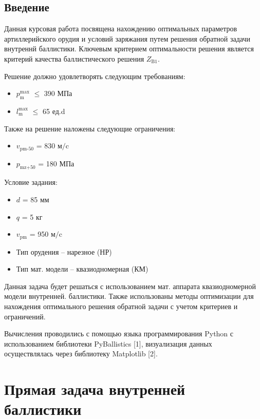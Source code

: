 \documentclass[14pt, a4paper]{extreport} %
\begin{document}


\newpage
\tableofcontents

\newpage
\section*{Введение}
Данная курсовая работа посвящена нахождению оптимальных параметров артиллерийского орудия и условий заряжания путем решения обратной задачи внутреннй баллистики.
Ключевым критерием оптимальности решения является критерий качества баллистического решения $Z_{\text{B1}}$. 

Решение должно удовлетворять следующим требованиям: 
\begin{itemize}
    \item  $p_{\text{m}}^{\text{max}}$ $\leq$ 390 МПа
    \item $l_{\text{m}}^{\text{max}}$ $\leq$ 65 ед.d
\end{itemize}

Также на решение наложены следующие ограничения: 
\begin{itemize}
    \item  $v_{\text{pm-50}}$ = 830 $\text{м/c}$
    \item $p_{\text{mz+50}}$ = 180 МПа
\end{itemize}

Условие задания: 
\begin{itemize}
    \item $d$ = 85 мм
    \item $q$ = 5 кг
    \item $v_{\text{pm}}$ = 950 $\text{м/c}$
    \item Тип орудения -- нарезное (НР)
    \item Тип мат. модели -- квазиодномерная (КМ)
\end{itemize}

Данная задача будет решаться с использованием мат. аппарата квазиодномерной модели внутренней.
баллистики. Также использованы методы оптимизации для нахождения оптимального решения обратной задачи с учетом критериев и ограничений.

Вычисления проводились с помощью языка программирования Python с использованием библиотеки PyBallistics [1], визуализация данных осуществлялась 
через библиотеку Matplotlib [2].

\newpage
\chapter{Прямая задача внутренней баллистики}
\end{document}
